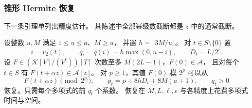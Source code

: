 \subsubsection{锥形 Hermite 恢复}
\label{subsec:tensor-hermite}

下一条引理单列出精度估计。
其陈述中全部幂级数截断都是 $z$
中的通常截断。

\begin{lemma}[锥形 Hermite 恢复]\label{lem:tapered-hermite}
设整数 $u,M$ 满足 $1\le u\le a$、$M\ge u$，
并置 $h=\lceil3M/u\rceil$。
对 $t\in S\setminus\{0\}$ 置
\[
 i=v_2(t),\qquad q_t=q(i)=h\max(0,u-i),\qquad D_t=L/2^i.
\]
设 $F\in(\mathcal K[V]/(V^\ell))[T]$
次数至多 $M(2L-1)$，$F(0)\in\mathcal A$，
且对每个 $t\in S$ 有
$F(t+\alpha z)\in\mathcal A[z]$。
对 $p\ge1$，其值 $F(0)$ 模 $2^p$
可以从
\[
 F(t+\alpha z)\pmod{2^{p_t}},
 \qquad
 p_t=p+8hD_t+8M(a+1),\qquad q_t>0
\]
恢复。只需每个多项式的前 $q_t$ 个系数。
恢复在 $M,L,\ell,e$ 与各精度上花费多项式时间与空间。
\end{lemma}
